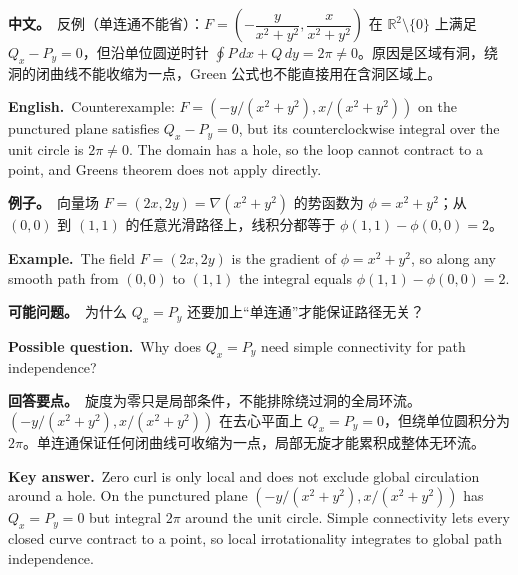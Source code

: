 \documentclass[UTF8,11pt,a4paper]{ctexart}
\newcommand{\BOTH}[2]{\par\noindent\textbf{中文。}\ #1\par\noindent\textbf{English.}\ #2\par}
\newcommand{\EX}[2]{\par\noindent\textbf{例子。}\ #1\par\noindent\textbf{Example.}\ #2\par}
\newcommand{\ASK}[4]{\begin{samepage}\par\noindent\textbf{可能问题。}\ #1\par\noindent\textbf{Possible question.}\ #2\par\noindent\textbf{回答要点。}\ #3\par\noindent\textbf{Key answer.}\ #4\medskip\end{samepage}}
\begin{document}
\BOTH{反例（单连通不能省）：$F=\left(-\dfrac{y}{x^2+y^2},\dfrac{x}{x^2+y^2}\right)$ 在 $\mathbb R^2\setminus\{0\}$ 上满足 $Q_x-P_y=0$，但沿单位圆逆时针 $\oint P\,dx+Q\,dy=2\pi\ne0$。原因是区域有洞，绕洞的闭曲线不能收缩为一点，Green 公式也不能直接用在含洞区域上。}{Counterexample: $F=(-y/(x^2+y^2),x/(x^2+y^2))$ on the punctured plane satisfies $Q_x-P_y=0$, but its counterclockwise integral over the unit circle is $2\pi\ne0$. The domain has a hole, so the loop cannot contract to a point, and Green\textquotesingle s theorem does not apply directly.}
\EX{向量场 $F=(2x,2y)=\nabla(x^2+y^2)$ 的势函数为 $\phi=x^2+y^2$；从 $(0,0)$ 到 $(1,1)$ 的任意光滑路径上，线积分都等于 $\phi(1,1)-\phi(0,0)=2$。}{The field $F=(2x,2y)$ is the gradient of $\phi=x^2+y^2$, so along any smooth path from $(0,0)$ to $(1,1)$ the integral equals $\phi(1,1)-\phi(0,0)=2$.}
\ASK{为什么 $Q_x=P_y$ 还要加上“单连通”才能保证路径无关？}{Why does $Q_x=P_y$ need simple connectivity for path independence?}{旋度为零只是局部条件，不能排除绕过洞的全局环流。$(-y/(x^2+y^2),x/(x^2+y^2))$ 在去心平面上 $Q_x=P_y=0$，但绕单位圆积分为 $2\pi$。单连通保证任何闭曲线可收缩为一点，局部无旋才能累积成整体无环流。}{Zero curl is only local and does not exclude global circulation around a hole. On the punctured plane $(-y/(x^2+y^2),x/(x^2+y^2))$ has $Q_x=P_y=0$ but integral $2\pi$ around the unit circle. Simple connectivity lets every closed curve contract to a point, so local irrotationality integrates to global path independence.}
\end{document}
